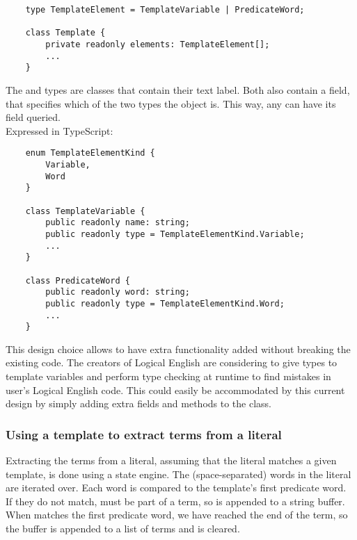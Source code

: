 \documentclass[../main.tex]{subfiles}
\begin{document}
\begin{lstlisting}
    type TemplateElement = TemplateVariable | PredicateWord;

    class Template {
        private readonly elements: TemplateElement[];
        ...
    }
\end{lstlisting}
The  and  types are classes that contain their text label. Both also contain a  field, that specifies which of the two types the object is. This way, any  can have its  field queried. \\
Expressed in TypeScript:

\begin{lstlisting}
    enum TemplateElementKind { 
        Variable,
        Word
    }

    class TemplateVariable {
        public readonly name: string;
        public readonly type = TemplateElementKind.Variable;
        ...
    }

    class PredicateWord {
        public readonly word: string;
        public readonly type = TemplateElementKind.Word;
        ...
    }
\end{lstlisting}
This design choice allows  to have extra functionality added without breaking the existing code. The creators of Logical English are considering to give types to template variables and perform type checking at runtime to find mistakes in user's Logical English code. This could easily be accommodated by this current design by simply adding extra fields and methods to the  class.


\subsubsection{Using a template to extract terms from a literal}
Extracting the terms from a literal, assuming that the literal matches a given template, is done using a state engine. The (space-separated) words in the literal are iterated over. Each word  is compared to the template's first predicate word. \\ 
If they do not match,  must be part of a term, so  is appended to a string buffer. When  matches the first predicate word, we have reached the end of the term, so the buffer is appended to a list of terms and is cleared.
\end{document}
